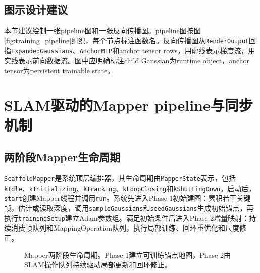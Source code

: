 \subsection{图示设计建议}

本节建议绘制一张pipeline图和一张反向传播图。pipeline图按图\ref{fig:training_pipeline}组织，每个节点标注函数名。反向传播图从\texttt{RenderOutput}回指\texttt{ExpandedGaussians}、\texttt{AnchorMLP}和anchor tensor rows，用虚线表示梯度流，用实线表示前向数据流。图中应明确标注child Gaussian为runtime object，anchor tensor为persistent trainable state。

\section{SLAM驱动的Mapper pipeline与同步机制}

\subsection{两阶段Mapper生命周期}

\texttt{ScaffoldMapper}是系统顶层编排器，其生命周期由\texttt{MapperState}表示，包括\texttt{kIdle}、\texttt{kInitializing}、\texttt{kTracking}、\texttt{kLoopClosing}和\texttt{kShuttingDown}。启动后，\texttt{start}创建Mapper线程并调用\texttt{run}。系统先进入Phase 1初始建图：累积若干关键帧，估计或读取深度，调用\texttt{sampleGaussians}和\texttt{seedGaussians}生成初始锚点，再执行\texttt{trainingSetup}建立Adam参数组。满足初始条件后进入Phase 2增量映射：持续消费帧队列和MappingOperation队列，执行局部训练、回环重优化和尺度修正。

\begin{figure}[htbp]
\centering
{}
\caption{Mapper两阶段生命周期。Phase 1建立可训练锚点地图，Phase 2由SLAM操作队列持续驱动局部更新和回环修正。}
\label{fig:mapper_lifecycle}
\end{figure}

